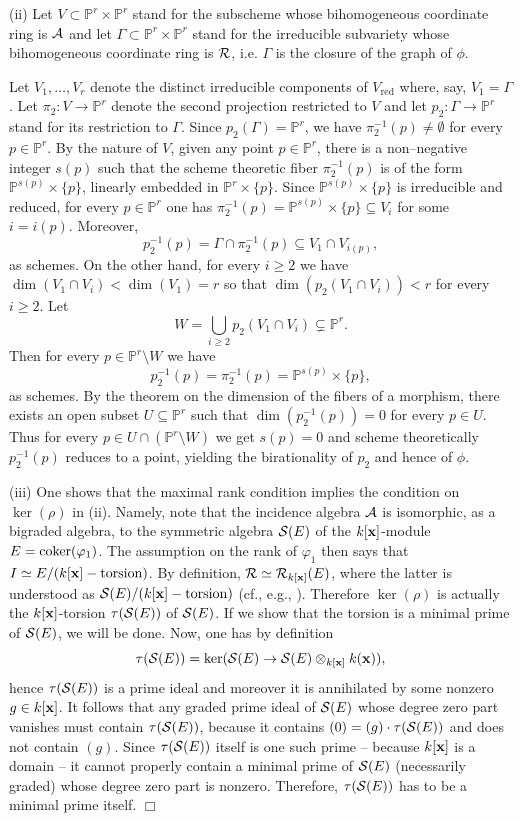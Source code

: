 \documentclass[11pt]{article}   %
\theoremstyle{definition}
\numberwithin{Theorem}{section} \numberwithin{equation}{section}
\def\QED{\hfill$\Box$}
\def\qed{\QED}
\newcommand{\rar}{\rightarrow}
\newcommand{\xx}{{\bf x}}
\newcommand{\p}{{\mathbb P}}
\newcommand{\red}{\operatorname{red}}
\begin{document}
{(ii) Let $ V\subset \p^r\times \p^r$ stand for the {subscheme}
whose bihomogeneous coordinate ring is ${\cal A}$ and let $
\Gamma\subset \p^r\times \p^r$ stand for the { irreducible}
subvariety whose bihomogeneous coordinate ring is ${\cal R}$, i.e.
$\Gamma$ is the closure of the graph of $\phi$. { Let $V_1,\ldots
, V_r$ denote the distinct irreducible components of $V_{\red}$
where, say, $V_1=\Gamma$. Let $\pi_2:V\to\p^r$ denote the second
projection restricted to $V$ and let $p_2:\Gamma\to\p^r$ stand for
its restriction  to $\Gamma$. Since
 $p_2(\Gamma)=\p^r$, we have $\pi_2^{-1}(p)\neq\emptyset$ for every
$p\in\p^r$. By the nature of $V$, given any point $p\in \p^ r$,
there is a non--negative integer $s(p)$ such that the scheme
theoretic fiber $\pi_2^{-1}(p)$ is of the form $\p^{s(p)}\times
\{p\}$, linearly embedded in $\p^r\times \{p\}$. Since
$\p^{s(p)}\times \{p\}$ is irreducible and reduced, for every
$p\in\p^r$ one has $\pi_2^{-1}(p)=\p^{s(p)}\times \{p\}\subseteq
V_i$ for some $i=i(p)$. Moreover,
$$p_2^{-1}(p)=\Gamma\cap \pi_2^{-1}(p)\subseteq V_1\cap V_{i(p)},$$
as schemes. On the other hand, for every $i\geq 2$ we have
$\dim(V_1\cap V_i)<\dim(V_1)=r$ so that $\dim(p_2(V_1\cap V_i))<r$
for every $i\geq 2$. Let
$$W=\bigcup_{i\geq 2}p_2(V_1\cap V_i)\subsetneq\p^r.$$
Then for every $p\in\p^r\setminus W$ we have
$$p_2^{-1}(p)=\pi_2^{-1}(p)=\p^{s(p)}\times \{p\},$$
as schemes. By the theorem on the dimension of the fibers of a
morphism, there exists an open subset $U\subseteq\p^r$ such that
$\dim(p_2^{-1}(p))=0$ for every $p\in U$. Thus for every $p\in U\cap
(\p^r\setminus W)$ we get $s(p)=0$ and scheme theoretically
$p_2^{-1}(p)$ reduces to a point, yielding the birationality of
$p_2$ and hence of $\phi$.

(iii) One shows that the maximal rank condition implies the
condition on $\ker(\rho)$ in (ii). Namely, note that the incidence
algebra ${\cal A}$ is isomorphic, as a bigraded algebra, to the
symmetric algebra ${\cal S}(E)$ of the $k[\xx]$-module $E={\rm
coker}(\varphi_1)$. The assumption on the rank of $\varphi_1$ then
says that $I\simeq E/(k[\xx]-{\rm torsion})$. By definition, ${\cal
R}\simeq {\cal R}_{k[\xx]}(E)$, where the latter is understood as
${\cal S}(E)/(k[\xx]-{\rm torsion})$ (cf., e.g., \cite{ram}).
Therefore $\ker(\rho)$ is actually the  $k[\xx]$-torsion $\tau({\cal
S}(E))$ of ${\cal S}(E)$. If we show that the torsion is a minimal
prime of ${\cal S}(E)$, we will be done. Now, one has by definition
$$\tau({\cal S}(E))=\ker({\cal S}(E)\rar {\cal S}(E)\otimes_{k[\xx]} k(\xx)),$$
hence $\tau({\cal S}(E))$ is a prime ideal and moreover it is
annihilated by some nonzero $g\in k[\xx]$. It follows that any
graded prime ideal of ${\cal S}(E)$ whose degree zero part vanishes
must contain $\tau({\cal S}(E))$, because it contains $(0)=(g)\cdot
\tau({\cal S}(E))$ and does not contain $(g)$.
Since $\tau({\cal S}(E))$ itself
is one such prime -- because $k[\xx]$ is a domain -- it cannot
properly contain a minimal prime of ${\cal S}(E)$ (necessarily
graded) whose degree zero part is nonzero. Therefore, $\tau({\cal
S}(E))$ has to be a minimal prime itself.
 \qed

}}
\end{document}
